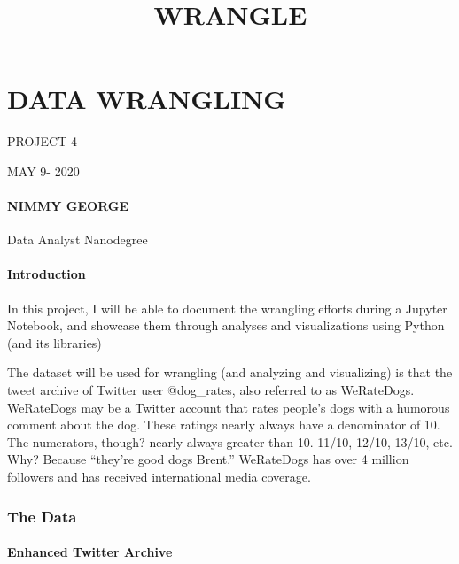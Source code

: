 \documentclass[11pt]{article}
\title{WRANGLE}
\begin{document}
    
    \maketitle
    
    

    
    \hypertarget{data-wrangling}{%
\section{DATA WRANGLING}\label{data-wrangling}}

    PROJECT 4

MAY 9- 2020

    \hypertarget{nimmy-george}{%
\paragraph{NIMMY GEORGE}\label{nimmy-george}}

Data Analyst Nanodegree

    \hypertarget{introduction}{%
\paragraph{Introduction}\label{introduction}}

In this project, I will be able to document the wrangling efforts during
a Jupyter Notebook, and showcase them through analyses and
visualizations using Python (and its libraries)

The dataset will be used for wrangling (and analyzing and visualizing)
is that the tweet archive of Twitter user @dog\_rates, also referred to
as WeRateDogs. WeRateDogs may be a Twitter account that rates people's
dogs with a humorous comment about the dog. These ratings nearly always
have a denominator of 10. The numerators, though? nearly always greater
than 10. 11/10, 12/10, 13/10, etc. Why? Because ``they're good dogs
Brent.'' WeRateDogs has over 4 million followers and has received
international media coverage.

    \hypertarget{the-data}{%
\subsubsection{The Data}\label{the-data}}

    \hypertarget{enhanced-twitter-archive}{%
\paragraph{Enhanced Twitter Archive}\label{enhanced-twitter-archive}}
\end{document}
